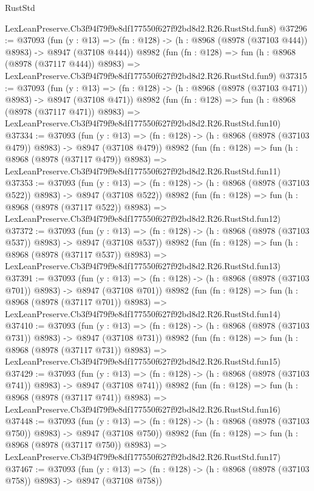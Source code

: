 \begin{lexlean}{RustStd}
\begin{coremodule}
    LexLeanPreserve.Cb3f94f79f9e8df177550f627f92bd8d2.R26.RustStd.fun8)
@37296 := @37093
    (fun (y : @13) => (fn : @128) -> (h : @8968 (@8978 (@37103 @444)) @8983) -> @8947 (@37108 @444))
    @8982
    (fun (fn : @128) =>
    fun (h : @8968 (@8978 (@37117 @444)) @8983) =>
    LexLeanPreserve.Cb3f94f79f9e8df177550f627f92bd8d2.R26.RustStd.fun9)
@37315 := @37093
    (fun (y : @13) => (fn : @128) -> (h : @8968 (@8978 (@37103 @471)) @8983) -> @8947 (@37108 @471))
    @8982
    (fun (fn : @128) =>
    fun (h : @8968 (@8978 (@37117 @471)) @8983) =>
    LexLeanPreserve.Cb3f94f79f9e8df177550f627f92bd8d2.R26.RustStd.fun10)
@37334 := @37093
    (fun (y : @13) => (fn : @128) -> (h : @8968 (@8978 (@37103 @479)) @8983) -> @8947 (@37108 @479))
    @8982
    (fun (fn : @128) =>
    fun (h : @8968 (@8978 (@37117 @479)) @8983) =>
    LexLeanPreserve.Cb3f94f79f9e8df177550f627f92bd8d2.R26.RustStd.fun11)
@37353 := @37093
    (fun (y : @13) => (fn : @128) -> (h : @8968 (@8978 (@37103 @522)) @8983) -> @8947 (@37108 @522))
    @8982
    (fun (fn : @128) =>
    fun (h : @8968 (@8978 (@37117 @522)) @8983) =>
    LexLeanPreserve.Cb3f94f79f9e8df177550f627f92bd8d2.R26.RustStd.fun12)
@37372 := @37093
    (fun (y : @13) => (fn : @128) -> (h : @8968 (@8978 (@37103 @537)) @8983) -> @8947 (@37108 @537))
    @8982
    (fun (fn : @128) =>
    fun (h : @8968 (@8978 (@37117 @537)) @8983) =>
    LexLeanPreserve.Cb3f94f79f9e8df177550f627f92bd8d2.R26.RustStd.fun13)
@37391 := @37093
    (fun (y : @13) => (fn : @128) -> (h : @8968 (@8978 (@37103 @701)) @8983) -> @8947 (@37108 @701))
    @8982
    (fun (fn : @128) =>
    fun (h : @8968 (@8978 (@37117 @701)) @8983) =>
    LexLeanPreserve.Cb3f94f79f9e8df177550f627f92bd8d2.R26.RustStd.fun14)
@37410 := @37093
    (fun (y : @13) => (fn : @128) -> (h : @8968 (@8978 (@37103 @731)) @8983) -> @8947 (@37108 @731))
    @8982
    (fun (fn : @128) =>
    fun (h : @8968 (@8978 (@37117 @731)) @8983) =>
    LexLeanPreserve.Cb3f94f79f9e8df177550f627f92bd8d2.R26.RustStd.fun15)
@37429 := @37093
    (fun (y : @13) => (fn : @128) -> (h : @8968 (@8978 (@37103 @741)) @8983) -> @8947 (@37108 @741))
    @8982
    (fun (fn : @128) =>
    fun (h : @8968 (@8978 (@37117 @741)) @8983) =>
    LexLeanPreserve.Cb3f94f79f9e8df177550f627f92bd8d2.R26.RustStd.fun16)
@37448 := @37093
    (fun (y : @13) => (fn : @128) -> (h : @8968 (@8978 (@37103 @750)) @8983) -> @8947 (@37108 @750))
    @8982
    (fun (fn : @128) =>
    fun (h : @8968 (@8978 (@37117 @750)) @8983) =>
    LexLeanPreserve.Cb3f94f79f9e8df177550f627f92bd8d2.R26.RustStd.fun17)
@37467 := @37093
    (fun (y : @13) => (fn : @128) -> (h : @8968 (@8978 (@37103 @758)) @8983) -> @8947 (@37108 @758))

\end{coremodule}
\end{lexlean}
